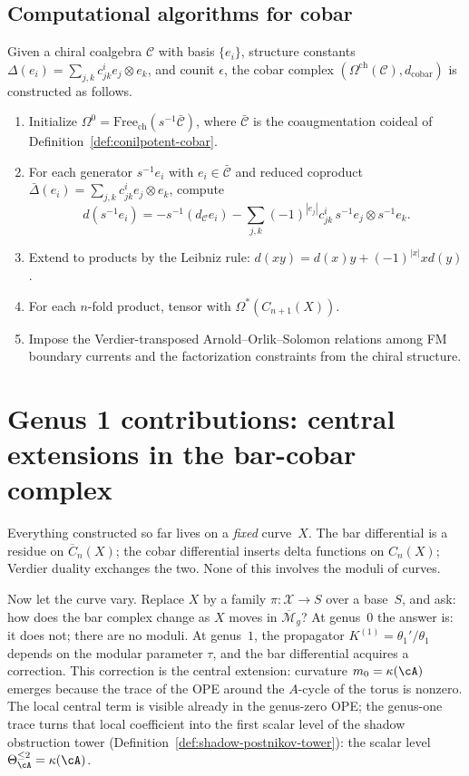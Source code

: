 \subsection{Computational algorithms for cobar}

\begin{remark}
Given a chiral coalgebra $\mathcal{C}$ with basis $\{e_i\}$, structure constants $\Delta(e_i) = \sum_{j,k} c_{jk}^i e_j \otimes e_k$, and counit $\epsilon$, the cobar complex $(\Omega^{\mathrm{ch}}(\mathcal{C}), d_{\mathrm{cobar}})$ is constructed as follows.
\begin{enumerate}
\item Initialize $\Omega^0 = \mathrm{Free}_{\mathrm{ch}}(s^{-1}\bar{\mathcal{C}})$, where $\bar{\mathcal{C}}$ is the coaugmentation coideal of Definition~\ref{def:conilpotent-cobar}.
\item For each generator $s^{-1}e_i$ with $e_i\in\bar{\mathcal C}$ and reduced coproduct $\bar\Delta(e_i)=\sum_{j,k} c_{jk}^i e_j\otimes e_k$, compute
\[
d(s^{-1}e_i)
=-s^{-1}(d_{\mathcal C}e_i)
-\sum_{j,k}(-1)^{|e_j|}c_{jk}^i\,
s^{-1}e_j\otimes s^{-1}e_k .
\]
\item Extend to products by the Leibniz rule: $d(xy) = d(x)y + (-1)^{|x|}xd(y)$.
\item For each $n$-fold product, tensor with $\Omega^*(C_{n+1}(X))$.
\item Impose the Verdier-transposed Arnold--Orlik--Solomon relations among FM boundary currents and the factorization constraints from the chiral structure.
\end{enumerate}
\end{remark}

\section{Genus 1 contributions: central extensions in the bar-cobar complex}
\label{sec:genus_1_central_extensions}

Everything constructed so far lives on a \emph{fixed} curve~$X$.
The bar differential is a residue on $\overline{C}_n(X)$; the
cobar differential inserts delta functions on $C_n(X)$; Verdier
duality exchanges the two. None of this involves the moduli of
curves.

Now let the curve vary. Replace $X$ by a family
$\pi \colon \mathcal{X} \to S$ over a base~$S$, and ask: how does
the bar complex change as $X$ moves in $\overline{\mathcal{M}}_g$?
At genus~$0$ the answer is: it does not; there are no moduli.
At genus~$1$, the propagator $K^{(1)} = \theta_1'/\theta_1$
depends on the modular parameter $\tau$, and the bar differential
acquires a correction. This correction is the central extension:
curvature $m_0 = \kappa(\cA)$ emerges because the trace of the
OPE around the $A$-cycle of the torus is nonzero. The local central
term is visible already in the genus-zero OPE; the genus-one trace
turns that local coefficient into the first scalar level of the
shadow obstruction tower
(Definition~\ref{def:shadow-postnikov-tower}):
the scalar level $\Theta_{\cA}^{\leq 2} = \kappa(\cA)$.

